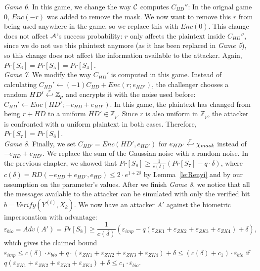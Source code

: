 \textit{Game 6.} In this game, we change the way $\mathcal{C}$ computes
$C_{HD}''$: In the orignal game 0, $Enc(-r)$ was added to remove the mask. We now
want to remove this $r$ from being used anywhere in the game, so we replace
this with $Enc(0)$. This change does not affect $\mathcal{A}$'s success
probability: $r$ only affects the plaintext inside $C_{HD}''$, since we do not
use this plaintext anymore (as it has been replaced in \textit{Game 5}), so this change
does not affect the information available to the attacker. Again, $Pr[S_6] = Pr[S_5] = Pr[S_4]$.\\
\textit{Game 7.} We modify the way $C_{HD}'$ is computed in this game. Instead
of calculating $C_{HD}' \gets (-1)C_{HD} + Enc(r;e_{HD'})$, the challenger chooses a
random $HD' \stackrel{r}{\hookleftarrow} \mathbb{Z}_p$ and encrypts it with the noise used
before: $C_{HD}' \gets Enc(HD'; -e_{HD} + e_{HD'})$. In this game, the
plaintext has changed from being $r + HD$ to a uniform $HD' \in \mathbb{Z}_p$.
Since $r$ is also uniform in $\mathbb{Z}_p$, the attacker is confronted with a uniform
plaintext in both cases. Therefore, $Pr[S_7] = Pr[S_6]$.\\
\textit{Game 8.} Finally, we set $C_{HD'} = Enc(HD', e_{HD'})$ for $e_{HD'}
\stackrel{r}{\hookleftarrow} \chi_{mask}$ instead of $-e_{HD} + e_{HD'}$. We replace the sum
of the Gaussian noise with a random noise. In the previous chapter, we
showed that $Pr[S_8] \geq \frac{1}{c(\delta)}(Pr[S_7]-q \cdot \delta)$, where $c(\delta) = RD(-e_{HD} + e_{HD'},
e_{HD}) \leq 2 \cdot e^{1+2\delta}$ by Lemma~\ref{le:Renyi} and by our assumption on the parameter's values. After we finish \textit{Game 8}, we notice that all the messages available to the attacker can be simulated with only the verified bit $b =
Verify(Y^{(i)}, X_k)$. We now have an attacker $A'$ against the biometric
impersonation with advantage:
\[
\varepsilon_{bio} = Adv(A') = Pr[S_8] \geq \frac{1}{c(\delta)}(\varepsilon_{imp} - q(\varepsilon_{ZK1}+\varepsilon_{ZK2} +
\varepsilon_{ZK3} + \varepsilon_{ZK4}) + \delta),
\]
which gives the claimed bound $\varepsilon_{imp} \leq c(\delta) \cdot \varepsilon_{bio} + q \cdot (\varepsilon_{ZK1}+\varepsilon_{ZK2} +
\varepsilon_{ZK3} + \varepsilon_{ZK4}) + \delta \leq (c(\delta)+c_1) \cdot \varepsilon_{bio}$ if $q(\varepsilon_{ZK1}+\varepsilon_{ZK2} +
\varepsilon_{ZK3} + \varepsilon_{ZK4}) + \delta \leq c_1 \cdot \varepsilon_{bio}$.


